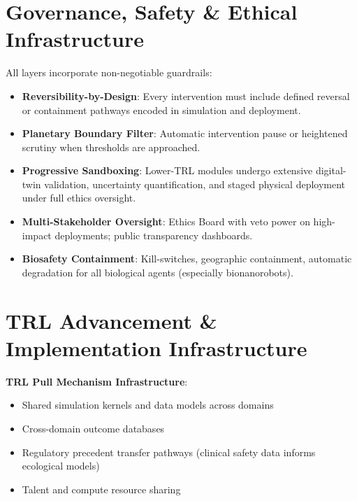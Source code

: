 \documentclass[11pt,a4paper]{report}
\begin{document}
\chapter{Governance, Safety \& Ethical Infrastructure}

All layers incorporate non-negotiable guardrails:

\begin{itemize}
    \item \textbf{Reversibility-by-Design}: Every intervention must include defined reversal or containment pathways encoded in simulation and deployment.
    \item \textbf{Planetary Boundary Filter}: Automatic intervention pause or heightened scrutiny when thresholds are approached.
    \item \textbf{Progressive Sandboxing}: Lower-TRL modules undergo extensive digital-twin validation, uncertainty quantification, and staged physical deployment under full ethics oversight.
    \item \textbf{Multi-Stakeholder Oversight}: Ethics Board with veto power on high-impact deployments; public transparency dashboards.
    \item \textbf{Biosafety Containment}: Kill-switches, geographic containment, automatic degradation for all biological agents (especially bionanorobots).
\end{itemize}

\chapter{TRL Advancement \& Implementation Infrastructure}

\textbf{TRL Pull Mechanism Infrastructure}:
\begin{itemize}
    \item Shared simulation kernels and data models across domains
    \item Cross-domain outcome databases
    \item Regulatory precedent transfer pathways (clinical safety data informs ecological models)
    \item Talent and compute resource sharing
\end{itemize}
\end{document}
